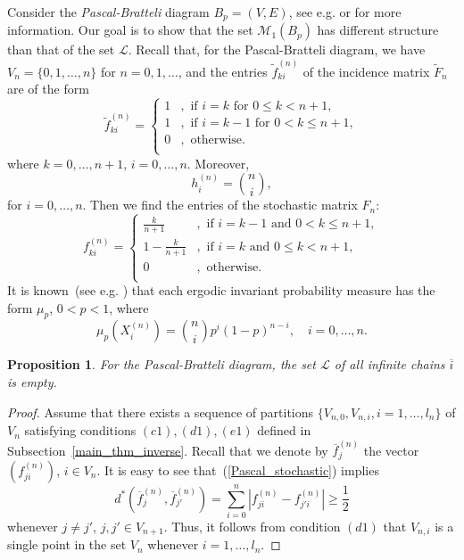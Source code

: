 \documentclass[11pt, english, reqno]{amsart}
\theoremstyle{definition}
\theoremstyle{remark}
\theoremstyle{plain}
\newtheorem{prop}[defin]{Proposition}
\def\ov{\overline}
\def\tl{\widetilde}
\numberwithin{equation}{section}
\begin{document}
{Consider the
\textit{Pascal-Bratteli} diagram $B_p = (V,E)$, see e.g.
\cite{MelaPetersen2005} or \cite{Vershik_2011, Vershik_2014,
FrickPetersenShields2017} for more information.
Our goal is to show that  the set $\mathcal{M}_1(B_p)$ has different
structure  than that of the set $\mathcal{L}$. Recall that, for the
Pascal-Bratteli diagram, we have $V_n = \{0,1,\ldots, n\}$ for $n = 0,1,
\ldots$, and the entries $\tl f_{ki}^{(n)}$ of the incidence matrix
$\tl F_n$  are of the form
$$
\tl f_{ki}^{(n)} =
\left\{
\begin{aligned}
1 &, \mbox{ if } i = k \mbox{ for } 0 \leq k < n+1,\\
1 &, \mbox{ if } i = k - 1 \mbox{ for } 0 < k \leq n+1,\\
0 &, \mbox{ otherwise}.\\
\end{aligned}
\right.
$$
where $k = 0, \ldots, n+1$,  $i = 0,\ldots,n$.
Moreover,
$$
h_i^{(n)} = {n \choose i},
$$
for $i = 0,\ldots,n$. Then we find the entries of the stochastic matrix
$F_n$:
\begin{equation}\label{Pascal_stochastic}
f_{ki}^{(n)} =
\left\{
\begin{aligned}
\frac{k}{n+1} &, \mbox{ if } i = k -1 \mbox{ and } 0 < k \leq n+1,\\
1 - \frac{k}{n+1} &, \mbox{ if } i = k \mbox{ and } 0 \leq k < n+1,\\
0 &, \mbox{ otherwise}.\\
\end{aligned}
\right.
\end{equation}
It is known~(see e.g. \cite{MelaPetersen2005}) that each ergodic invariant
 probability measure has the form $\mu_p$, $0 < p < 1$, where
$$
\mu_p\left(X_i^{(n)}\right) = {n \choose i}p^i (1-p)^{n-i}, \quad i = 0,
\ldots,n.
$$

\begin{prop} For the Pascal-Bratteli diagram,
the set $\mathcal{L}$ of all infinite chains $\overline{i}$ is empty.
\end{prop}

\begin{proof}
Assume that there exists a sequence of partitions $\{V_{n,0}, V_{n,i}, i = 1,
\ldots,l_n\}$ of $V_n$ satisfying conditions $(c1),(d1),(e1)$ defined in
Subsection~\ref{main_thm_inverse}. Recall that we denote by
$\ov f_j^{(n)}$ the vector  $(f_{ji}^{(n)})$, $i \in V_n$.
It is easy to see that~(\ref{Pascal_stochastic}) implies
$$
d^{*}(\ov f_j^{(n)}, \ov f_{j'}^{(n)}) = \sum_{i = 0}^{n} |f_{ji}^{(n)} -
f_{j'i}^{(n)}| \geq \frac{1}{2}
$$
whenever $j \neq j'$, $j,j' \in V_{n+1}$.
Thus,  it follows from condition $(d1)$ that $V_{n,i}$ is a single point in
the set  $V_n$ whenever $i = 1, \ldots, l_n$.


\end{proof}}
\end{document}
